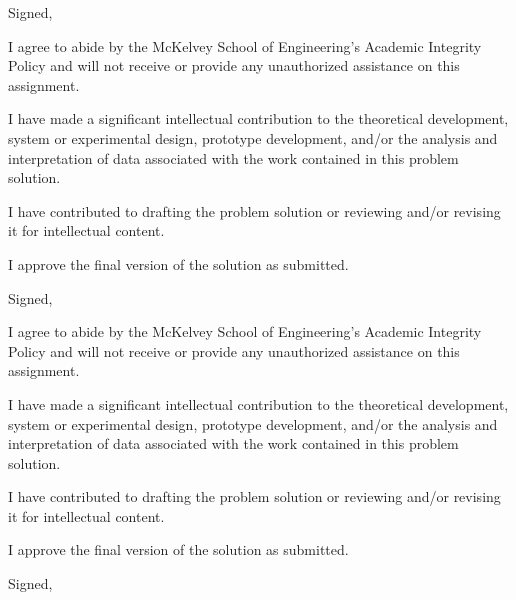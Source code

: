 \documentclass[11pt,letterpaper]{article}
\begin{document}
\vspace{10pt}

\noindent Signed, \underline{\hspace{9cm}}


\begin{todolist}
    \item I agree to abide by the McKelvey School of Engineering's Academic Integrity Policy and will not receive or provide any unauthorized assistance on this assignment.
    \item I have made a significant intellectual contribution to the theoretical development, system or experimental design, prototype development, and/or the analysis and interpretation of data associated with the work contained in this problem solution.
    \item I have contributed to drafting the problem solution or reviewing and/or revising it for intellectual content.
    \item I approve the final version of the solution as submitted.
\end{todolist}

\vspace{10pt}

\noindent Signed, \underline{\hspace{9cm}}


\begin{todolist}
    \item I agree to abide by the McKelvey School of Engineering's Academic Integrity Policy and will not receive or provide any unauthorized assistance on this assignment.
    \item I have made a significant intellectual contribution to the theoretical development, system or experimental design, prototype development, and/or the analysis and interpretation of data associated with the work contained in this problem solution.
    \item I have contributed to drafting the problem solution or reviewing and/or revising it for intellectual content.
    \item I approve the final version of the solution as submitted.
\end{todolist}

\vspace{10pt}

\noindent Signed, \underline{\hspace{9cm}}
\end{document}
